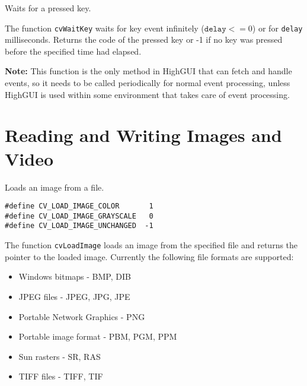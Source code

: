 Waits for a pressed key.


\begin{description}
\end{description}

The function \texttt{cvWaitKey} waits for key event infinitely ($ \texttt{delay} <= 0$) or for \texttt{delay} milliseconds. Returns the code of the pressed key or -1 if no key was pressed before the specified time had elapsed.

\textbf{Note:} This function is the only method in HighGUI that can fetch and handle events, so it needs to be called periodically for normal event processing, unless HighGUI is used within some environment that takes care of event processing.


\section{Reading and Writing Images and Video}

Loads an image from a file.


\begin{lstlisting}
#define CV_LOAD_IMAGE_COLOR       1
#define CV_LOAD_IMAGE_GRAYSCALE   0
#define CV_LOAD_IMAGE_UNCHANGED  -1
\end{lstlisting}

\begin{description}
\end{description}

The function \texttt{cvLoadImage} loads an image from the specified file and returns the pointer to the loaded image. Currently the following file formats are supported:
\begin{itemize}
\item Windows bitmaps - BMP, DIB
\item JPEG files - JPEG, JPG, JPE
\item Portable Network Graphics - PNG
\item Portable image format - PBM, PGM, PPM
\item Sun rasters - SR, RAS
\item TIFF files - TIFF, TIF
\end{itemize}


